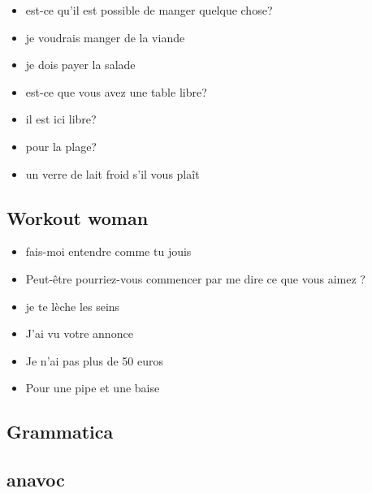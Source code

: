 \begin{itemize}
\item est-ce qu'il est possible de manger quelque chose?

\item je voudrais manger de la viande

\item je dois payer la salade

\item est-ce que vous avez une table libre?

\item il est ici libre?

\item pour la plage?

\item un verre de lait froid s'il vous pla\^it

\end{itemize}


\subsection{Workout woman}

\begin{itemize}

\item fais-moi entendre comme tu jouis

\item Peut-\^etre pourriez-vous commencer par me dire ce que vous aimez ?

\item je te l\`eche les seins

\item J'ai vu votre annonce

\item Je n'ai pas plus de 50 euros

\item Pour une pipe et une baise

\end{itemize}

\subsection{Grammatica}



\subsection{anavoc}



\begin{vocabolario}
\end{vocabolario}
